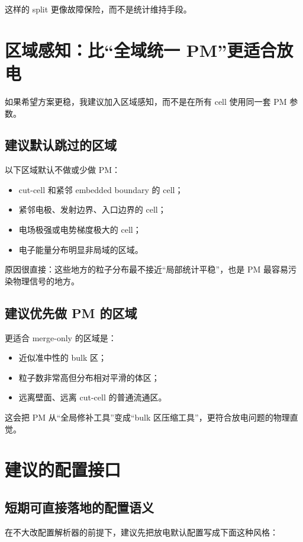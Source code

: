 \documentclass[UTF8,11pt,a4paper]{ctexart}
\begin{document}
这样的 split 更像故障保险，而不是统计维持手段。

\section{区域感知：比“全域统一 PM”更适合放电}

如果希望方案更稳，我建议加入区域感知，而不是在所有 cell 使用同一套 PM 参数。

\subsection{建议默认跳过的区域}
以下区域默认不做或少做 PM：
\begin{itemize}[itemsep=3pt]
  \item cut-cell 和紧邻 embedded boundary 的 cell；
  \item 紧邻电极、发射边界、入口边界的 cell；
  \item 电场极强或电势梯度极大的 cell；
  \item 电子能量分布明显非局域的区域。
\end{itemize}

原因很直接：这些地方的粒子分布最不接近“局部统计平稳”，也是 PM 最容易污染物理信号的地方。

\subsection{建议优先做 PM 的区域}
更适合 merge-only 的区域是：
\begin{itemize}[itemsep=3pt]
  \item 近似准中性的 bulk 区；
  \item 粒子数非常高但分布相对平滑的体区；
  \item 远离壁面、远离 cut-cell 的普通流通区。
\end{itemize}

这会把 PM 从“全局修补工具”变成“bulk 区压缩工具”，更符合放电问题的物理直觉。

\section{建议的配置接口}

\subsection{短期可直接落地的配置语义}
在不大改配置解析器的前提下，建议先把放电默认配置写成下面这种风格：
\end{document}
